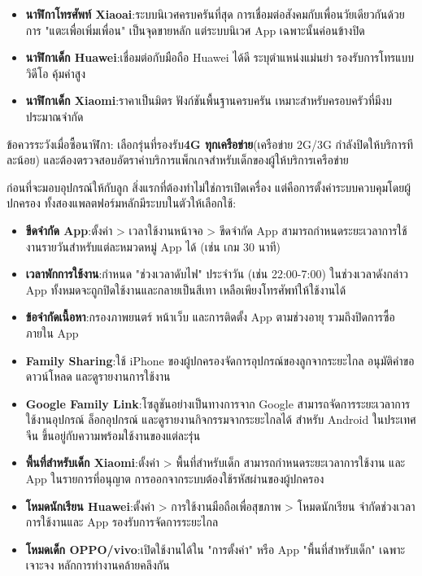 \begin{itemize}
  \item \textbf{นาฬิกาโทรศัพท์ Xiaoai}:ระบบนิเวศครบครันที่สุด การเชื่อมต่อสังคมกับเพื่อนวัยเดียวกันด้วยการ "แตะเพื่อเพิ่มเพื่อน" เป็นจุดขายหลัก แต่ระบบนิเวศ App เฉพาะนั้นค่อนข้างปิด
  \item \textbf{นาฬิกาเด็ก Huawei}:เชื่อมต่อกับมือถือ Huawei ได้ดี ระบุตำแหน่งแม่นยำ รองรับการโทรแบบวิดีโอ คุ้มค่าสูง
  \item \textbf{นาฬิกาเด็ก Xiaomi}:ราคาเป็นมิตร ฟังก์ชันพื้นฐานครบครัน เหมาะสำหรับครอบครัวที่มีงบประมาณจำกัด
\end{itemize}

ข้อควรระวังเมื่อซื้อนาฬิกา: เลือกรุ่นที่รองรับ\textbf{4G ทุกเครือข่าย}(เครือข่าย 2G/3G กำลังปิดให้บริการทีละน้อย) และต้องตรวจสอบอัตราค่าบริการแพ็กเกจสำหรับเด็กของผู้ให้บริการเครือข่าย


ก่อนที่จะมอบอุปกรณ์ให้กับลูก สิ่งแรกที่ต้องทำไม่ใช่การเปิดเครื่อง แต่คือการตั้งค่าระบบควบคุมโดยผู้ปกครอง ทั้งสองแพลตฟอร์มหลักมีระบบในตัวให้เลือกใช้:


\begin{itemize}
  \item \textbf{ขีดจำกัด App}:ตั้งค่า > เวลาใช้งานหน้าจอ > ขีดจำกัด App สามารถกำหนดระยะเวลาการใช้งานรายวันสำหรับแต่ละหมวดหมู่ App ได้ (เช่น เกม 30 นาที)
  \item \textbf{เวลาพักการใช้งาน}:กำหนด "ช่วงเวลาดับไฟ" ประจำวัน (เช่น 22:00-7:00) ในช่วงเวลาดังกล่าว App ทั้งหมดจะถูกปิดใช้งานและกลายเป็นสีเทา เหลือเพียงโทรศัพท์ให้ใช้งานได้
  \item \textbf{ข้อจำกัดเนื้อหา}:กรองภาพยนตร์ หน้าเว็บ และการติดตั้ง App ตามช่วงอายุ รวมถึงปิดการซื้อภายใน App
  \item \textbf{Family Sharing}:ใช้ iPhone ของผู้ปกครองจัดการอุปกรณ์ของลูกจากระยะไกล อนุมัติคำขอดาวน์โหลด และดูรายงานการใช้งาน
\end{itemize}


\begin{itemize}
  \item \textbf{Google Family Link}:โซลูชันอย่างเป็นทางการจาก Google สามารถจัดการระยะเวลาการใช้งานอุปกรณ์ ล็อกอุปกรณ์ และดูรายงานกิจกรรมจากระยะไกลได้ สำหรับ Android ในประเทศจีน ขึ้นอยู่กับความพร้อมใช้งานของแต่ละรุ่น
  \item \textbf{พื้นที่สำหรับเด็ก Xiaomi}:ตั้งค่า > พื้นที่สำหรับเด็ก สามารถกำหนดระยะเวลาการใช้งาน และ App ในรายการที่อนุญาต การออกจากระบบต้องใช้รหัสผ่านของผู้ปกครอง
  \item \textbf{โหมดนักเรียน Huawei}:ตั้งค่า > การใช้งานมือถือเพื่อสุขภาพ > โหมดนักเรียน จำกัดช่วงเวลาการใช้งานและ App รองรับการจัดการระยะไกล
  \item \textbf{โหมดเด็ก OPPO/vivo}:เปิดใช้งานได้ใน "การตั้งค่า" หรือ App "พื้นที่สำหรับเด็ก" เฉพาะเจาะจง หลักการทำงานคล้ายคลึงกัน
\end{itemize}

